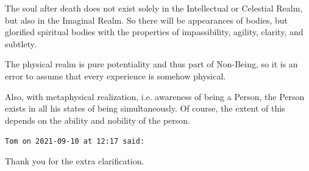 \begin{footnotesize}
\begin{sffamily}
The soul after death does not exist solely in the Intellectual or Celestial Realm, but also in the Imaginal Realm. So there will be appearances of bodies, but glorified spiritual bodies with the properties of impassibility, agility, clarity, and subtlety.

The physical realm is pure potentiality and thus part of Non-Being, so it is an error to assume that every experience is somehow physical.

Also, with metaphysical realization, i.e. awareness of being a Person, the Person exists in all his states of being simultaneously. Of course, the extent of this depends on the ability and nobility of the person.


\hfill

\texttt{Tom on 2021-09-10 at 12:17 said: }

Thank you for the extra clarification.


\hfill

\end{sffamily}\end{footnotesize}

